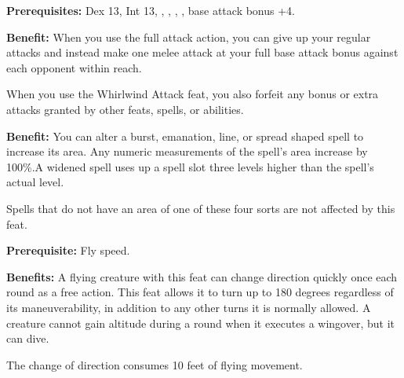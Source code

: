 
\textbf{Prerequisites:} Dex 13, Int 13, , , , , base attack bonus +4.

\textbf{Benefit:} When you use the full attack action, you can give up your regular 
attacks and instead make one melee attack at your full base attack bonus against 
each opponent within reach.

When you use the Whirlwind Attack feat, you also forfeit any bonus or extra attacks 
granted by other feats, spells, or abilities.


\textbf{Benefit:} You can alter a burst, emanation, line, or spread shaped spell 
to increase its area. Any numeric measurements of the spell's area increase by 
100\%.A widened spell uses up a spell slot three levels higher than the spell's 
actual level.

Spells that do not have an area of one of these four sorts are not affected by 
this feat.


\textbf{Prerequisite:} Fly speed.

\textbf{Benefits:} A flying creature with this feat can change direction quickly 
once each round as a free action. This feat allows it to turn up to 180 degrees 
regardless of its maneuverability, in addition to any other turns it is normally 
allowed. A creature cannot gain altitude during a round when it executes a wingover, 
but it can dive.

The change of direction consumes 10 feet of flying movement.
